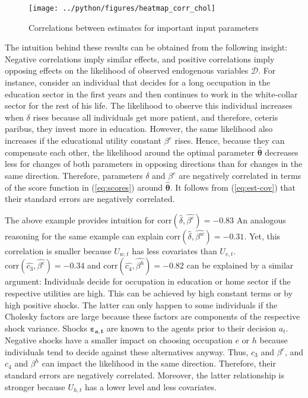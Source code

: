 \begin{figure}[H]
	\caption{Correlations between estimates for important input parameters}
	\centering
	\texttt{[image: ../python/figures/heatmap\_corr\_chol]}
	\label{fig:corr}
\end{figure}
\noindent
The intuition behind these results can be obtained from the following insight: Negative correlations imply similar effects, and positive correlations imply opposing effects on the likelihood of observed endogenous variables $\pmb{\mathcal{D}}$. For instance, consider an individual that decides for a long occupation in the education sector in the first years and then continues to work in the white-collar sector for the rest of his life. The likelihood to observe this individual increases when $\delta$ rises because all individuals get more patient, and therefore, ceteris paribus, they invest more in education. However, the same likelihood also increases if the educational utility constant $\beta^e$ rises. Hence, because they can compensate each other, the likelihood around the optimal parameter $\pmb{\hat{\theta}}$ decreases less for changes of both parameters in opposing directions than for changes in the same direction. Therefore, parameters $\delta$ and $\beta^e$ are negatively correlated in terms of the score function in (\ref{eq:scores}) around $\pmb{\hat{\theta}}$. It follows from (\ref{eq:est-cov}) that their standard errors are negatively correlated.

The above example provides intuition for $\text{corr}(\hat{\delta},\hat{\beta^e})=-0.83$ An analogous reasoning for the same example can explain $\text{corr}(\hat{\delta},\hat{\beta^w})=-0.31$. Yet, this correlation is smaller because $U_{w,t}$ has less covariates than $U_{e,t}$. $\text{corr}(\hat{c_3},\hat{\beta^e})=-0.34$ and $\text{corr}(\hat{c_4},\hat{\beta^h})=-0.82$ can be explained by a similar argument: Individuals decide for occupation in education or home sector if the respective utilities are high. This can be achieved by high constant terms or by high positive shocks. The latter can only happen to some individuals if the Cholesky factors are large because these factors are components of the respective shock variance. Shocks $\pmb{\varepsilon_{a,t}}$ are known to the agents prior to their decision $a_t$. Negative shocks have a smaller impact on choosing occupation $e$ or $h$ because individuals tend to decide against these alternatives anyway. Thus, $c_3$ and $\beta^e$, and $c_4$ and $\beta^h$ can impact the likelihood in the same direction. Therefore, their standard errors are negatively correlated. Moreover, the latter relationship is stronger because $U_{h,t}$ has a lower level and less covariates.


